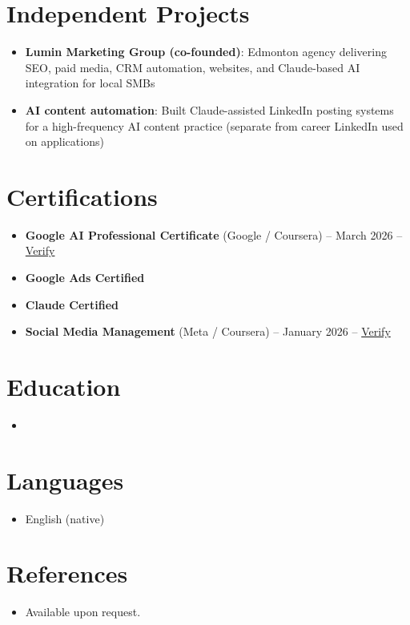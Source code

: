 \documentclass[11pt,a4paper,sans]{moderncv}
\begin{document}
\section{Independent Projects}
\vspace{1pt}
\begin{itemize}
\item \textbf{Lumin Marketing Group (co-founded)}: Edmonton agency delivering SEO, paid media, CRM automation, websites, and Claude-based AI integration for local SMBs
\item \textbf{AI content automation}: Built Claude-assisted LinkedIn posting systems for a high-frequency AI content practice (separate from career LinkedIn used on applications)
\end{itemize}

\section{Certifications}
\vspace{1pt}
\begin{itemize}
\item \textbf{Google AI Professional Certificate} (Google / Coursera) -- March 2026 -- \href{https://www.coursera.org/account/accomplishments/verify/professional-cert/54E1P3RBHVL8}{Verify}
\item \textbf{Google Ads Certified}
\item \textbf{Claude Certified}
\item \textbf{Social Media Management} (Meta / Coursera) -- January 2026 -- \href{https://www.coursera.org/account/accomplishments/verify/7NOVGMU2L69G}{Verify}
\end{itemize}

\section{Education}
\vspace{1pt}
\begin{itemize}
\item{}
\end{itemize}

\section{Languages}
\vspace{1pt}
\begin{itemize}
\item English (native)
\end{itemize}

\section{References}
\vspace{1pt}
\begin{itemize}
\item{Available upon request.}
\end{itemize}
\end{document}
